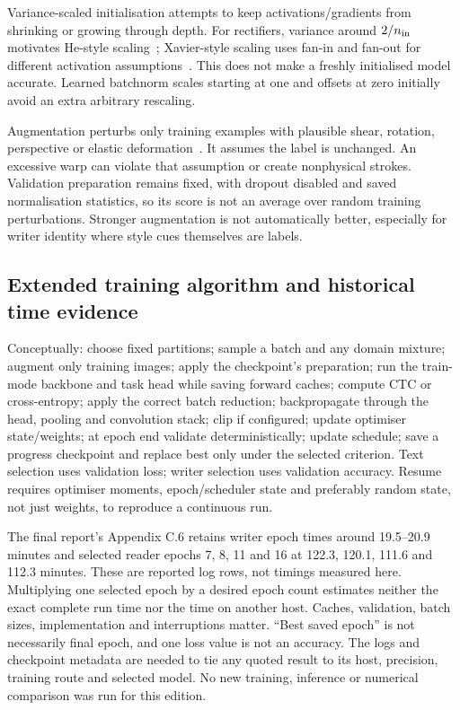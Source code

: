 Variance-scaled initialisation attempts to keep activations/gradients from
shrinking or growing through depth. For rectifiers, variance around
$2/n_{\rm in}$ motivates He-style scaling~\cite{he2015}; Xavier-style scaling
uses fan-in and fan-out for different activation assumptions~\cite{glorot2010}.
This does not make a freshly initialised model accurate. Learned batchnorm
scales starting at one and offsets at zero initially avoid an extra arbitrary
rescaling.

Augmentation perturbs only training examples with plausible shear, rotation,
perspective or elastic deformation~\cite{simard2003}. It assumes the label
is unchanged. An excessive warp can violate that assumption or create
nonphysical strokes. Validation preparation remains fixed, with dropout
disabled and saved normalisation statistics, so its score is not an average
over random training perturbations. Stronger augmentation is not automatically
better, especially for writer identity where style cues themselves are labels.

\subsection{Extended training algorithm and historical time evidence}
Conceptually: choose fixed partitions; sample a batch and any domain mixture;
augment only training images; apply the checkpoint's preparation; run the
train-mode backbone and task head while saving forward caches; compute CTC
or cross-entropy; apply the correct batch reduction; backpropagate through
the head, pooling and convolution stack; clip if configured; update optimiser
state/weights; at epoch end validate deterministically; update schedule;
save a progress checkpoint and replace best only under the selected criterion.
Text selection uses validation loss; writer selection uses validation accuracy.
Resume requires optimiser moments, epoch/scheduler state and preferably
random state, not just weights, to reproduce a continuous run.

The final report's Appendix C.6 retains writer epoch times around 19.5--20.9
minutes and selected reader epochs 7, 8, 11 and 16 at 122.3, 120.1, 111.6
and 112.3 minutes. These are reported log rows, not timings measured here.
Multiplying one selected epoch by a desired epoch count estimates neither
the exact complete run time nor the time on another host. Caches, validation,
batch sizes, implementation and interruptions matter. ``Best saved epoch''
is not necessarily final epoch, and one loss value is not an accuracy.
The logs and checkpoint metadata are needed to tie any quoted result to
its host, precision, training route and selected model. No new training,
inference or numerical comparison was run for this edition.
